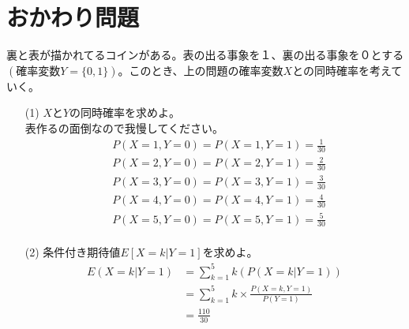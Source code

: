 \documentclass[a4j,uplatex]{jsarticle}
\begin{document}
\section*{おかわり問題}
裏と表が描かれてるコインがある。表の出る事象を１、裏の出る事象を０とする$(確率変数Y=\{ 0,1\})$。このとき、上の問題の確率変数$X$との同時確率を考えていく。
\begin{itemize}
  \item[(1)] $X$と$Y$の同時確率を求めよ。
  \\ 
  表作るの面倒なので我慢してください。
  \\
  \begin{equation}
    \begin{split}
      &P(X=1,Y=0)=P(X=1,Y=1)=\frac{1}{30}\\
      &P(X=2,Y=0)=P(X=2,Y=1)=\frac{2}{30}\\
      &P(X=3,Y=0)=P(X=3,Y=1)=\frac{3}{30}\\
      &P(X=4,Y=0)=P(X=4,Y=1)=\frac{4}{30}\\
      &P(X=5,Y=0)=P(X=5,Y=1)=\frac{5}{30}\\
    \end{split}
  \end{equation}
  \item[(2)] 条件付き期待値$E[X=k|Y=1]$を求めよ。
  \begin{equation}
    \begin{split}
      E(X=k|Y=1)&=\sum_{k=1}^5 k(P(X=k|Y=1))\\
      &=\sum_{k=1}^5 k\times \frac{P(X=k,Y=1)}{P(Y=1)}\\
      &=\frac{110}{30}
    \end{split}
  \end{equation} 
\end{itemize}
\end{document}
